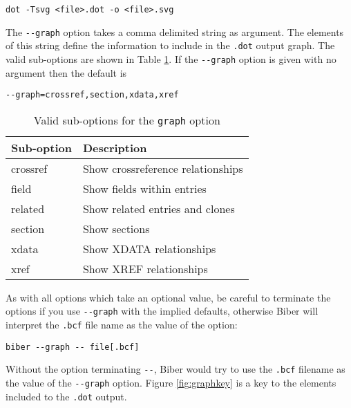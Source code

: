 \documentclass{ltxdockit}
\begin{document}
\begin{verbatim}
dot -Tsvg <file>.dot -o <file>.svg
\end{verbatim}

\noindent The \verb+--graph+ option takes a comma delimited string as
argument. The elements of this string define the information to include in
the \verb+.dot+ output graph. The valid sub-options are shown in Table
\ref{tab:graphopts}. If the \verb+--graph+ option is given with no argument
then the default is

\begin{verbatim}
--graph=crossref,section,xdata,xref
\end{verbatim}

\begin{table}
\begin{center}
\small
\begin{tabular}{ll}
\toprule
Sub-option & Description\\
\midrule
crossref & Show crossreference relationships\\
field    & Show fields within entries\\
related  & Show related entries and clones\\
section  & Show sections\\
xdata    & Show XDATA relationships\\
xref     & Show XREF relationships\\
\bottomrule
\end{tabular}
\end{center}
\caption{Valid sub-options for the \texttt{graph} option}
\label{tab:graphopts}
\end{table}

\noindent As with all options which take an optional value, be careful to
terminate the options if you use \verb+--graph+ with the implied defaults,
otherwise Biber will interpret the \verb+.bcf+ file name as the value of
the option:

\begin{verbatim}
biber --graph -- file[.bcf]
\end{verbatim}

\noindent Without the option terminating \verb+--+, Biber would try to use
the \verb+.bcf+ filename as the value of the \verb+--graph+ option. Figure
\ref{fig:graphkey} is a key to the elements included to the \verb+.dot+
output.
\end{document}

